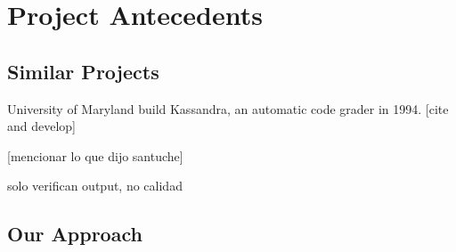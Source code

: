 \section{Project Antecedents}

\subsection{Similar Projects}

University of Maryland build Kassandra, an automatic code grader in 1994. [cite and develop]

[mencionar lo que dijo santuche]

solo verifican output, no calidad


\subsection{Our Approach}

